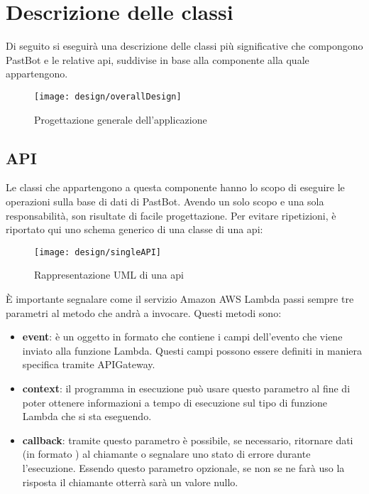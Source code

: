 \section{Descrizione delle classi}
Di seguito si eseguirà una descrizione delle classi più significative che
compongono PastBot e le relative \gls{api}, suddivise in base alla componente
alla quale appartengono.

\begin{figure}[H]
  \centering
  \texttt{[image: design/overallDesign]}
  \caption{Progettazione generale dell'applicazione}
\end{figure}

\subsection{API}
\label{design:api}

Le classi che appartengono a questa componente hanno lo scopo di eseguire le
operazioni sulla base di dati di PastBot. Avendo un solo scopo e una sola
responsabilità, son risultate di facile progettazione.
Per evitare ripetizioni, è riportato qui uno schema generico di una classe
di una \gls{api}:

\begin{figure}[H]
  \centering
  \texttt{[image: design/singleAPI]}
  \caption{Rappresentazione UML di una \gls{api}}
\end{figure}

\label{design:api:params}
È importante segnalare come il servizio Amazon AWS Lambda passi sempre tre
parametri al metodo che andrà a invocare. Questi metodi sono:
\begin{itemize}
  \item \textbf{event}: è un oggetto in formato
 che contiene i campi dell'evento che
viene inviato alla funzione Lambda. Questi campi possono essere definiti in
maniera specifica tramite APIGateway.
  \item \textbf{context}: il programma in esecuzione può usare questo parametro
al fine di poter ottenere informazioni a tempo di esecuzione sul tipo di
funzione Lambda che si sta eseguendo.
  \item \textbf{callback}: tramite questo parametro è possibile, se necessario,
ritornare dati (in formato ) al
chiamante o segnalare uno stato di errore durante l'esecuzione. Essendo questo
parametro opzionale, se non se ne farà uso la risposta il chiamante otterrà sarà
un valore nullo.
\end{itemize}

